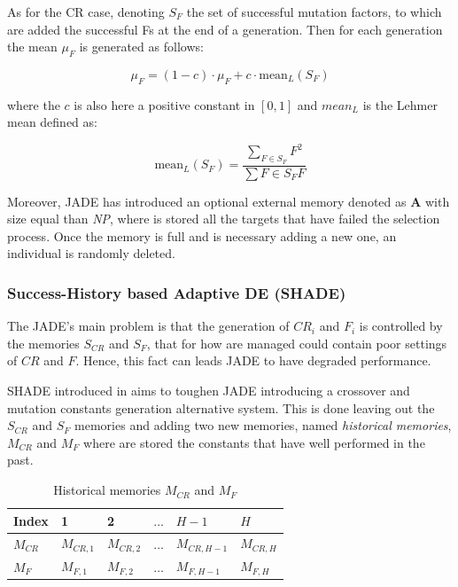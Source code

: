 \begin{itemize}
{		As for the CR case, denoting $S_{\textit{F}}$ the set of successful mutation factors, to which are added the successful Fs at the end of a generation. Then for each generation the mean $\mu_{F}$ is generated as follows:
		\begin{center}
			\begin{equation}
				\mu_{F} = (1 - c)\cdot\mu_{F} + c\cdot\textrm{mean}_{L}(S_{F})
			\end{equation}
		\end{center}
		where the $c$ is also here a positive constant in $[0, 1]$ and $\textit{mean}_{L}$ is the Lehmer mean defined as:
		\begin{center}
			\begin{equation}
				\textrm{mean}_{L}(S_{F}) = \frac{\sum_{F \in S_{F}}F^{2}}{\sum\limits{F \in S_{F}}F} 
			\end{equation}
		\end{center}
		}
\end{itemize}

Moreover, JADE has introduced an optional external memory denoted as \textbf{A} with size equal than \textit{NP}, where is stored all the targets that have failed the selection process. Once the memory is full and is necessary adding a new one, an individual is randomly deleted.

\subsubsection{Success-History based Adaptive DE (SHADE)}
The JADE's main problem is that the generation of $\textit{CR}_{i}$ and $F_{i}$ is controlled by the memories $S_{\textit{CR}}$ and $S_{F}$, that for how are managed could contain poor settings of $\textit{CR}$ and $F$. Hence, this fact can leads JADE to have degraded performance. 

SHADE introduced in \cite{SHADE:2013} aims to toughen JADE introducing a crossover and mutation constants generation alternative system. This is done leaving out the $S_{\textit{CR}}$ and $S_{F}$ memories and adding two new memories, named \textit{historical memories}, $M_{\textit{CR}}$ and $M_{F}$ where are stored the constants that have well performed in the past.\\

\begin{table}[h]
	\centering
	\begin{tabular}{|l|l|l|l|l|l|}
		\hline
		Index             & 1                   & 2                   & $\dots$ & $H -1$                & $H$                 \\ 
		\hline
		$M_{\textit{CR}}$ & $M_{\textit{CR},1}$ & $M_{\textit{CR},2}$ & $\dots$ & $M_{\textit{CR},H-1}$ & $M_{\textit{CR},H}$ \\ 
		\hline
		$M_{F}$           & $M_{F, 1}$          & $M_{F, 2}$          & $\dots$ & $M_{F, H-1}$          & $M_{F, H}$          \\ 
		\hline
	\end{tabular}
	\caption{Historical memories $M_{\textit{CR}}$ and $M_{F}$}
\end{table}

